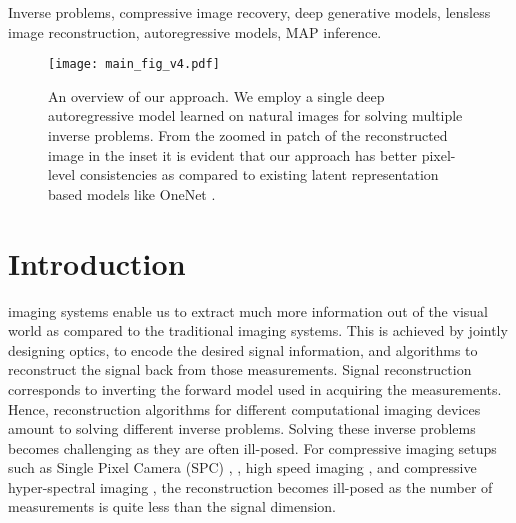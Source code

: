 \documentclass[journal,twoside]{IEEEtran}
\begin{document}
\begin{IEEEkeywords}
Inverse problems, compressive image recovery, deep generative models, lensless image reconstruction,  autoregressive models, MAP inference.
\end{IEEEkeywords}






%
\IEEEpeerreviewmaketitle

\begin{figure*}
    \centering
    \texttt{[image: main\_fig\_v4.pdf]}
    \caption{An overview of our approach. We employ a single deep autoregressive model learned on natural images for solving multiple inverse problems. From the zoomed in patch of the reconstructed image in the inset it is evident that our approach has better pixel-level consistencies as compared to existing latent representation based models like OneNet \cite{chang2017one}.}
    \label{fig:main_fig}
\end{figure*}

\section{Introduction}

 imaging systems enable us to extract much more information out of the visual world as compared to the traditional imaging systems. This is achieved by jointly designing optics, to encode the desired signal information, and algorithms to reconstruct the signal back from those measurements. Signal reconstruction corresponds to inverting the forward model used in acquiring the measurements. Hence, reconstruction algorithms for different computational imaging devices amount to solving different inverse problems. Solving these inverse problems becomes challenging as they are often ill-posed. For  compressive imaging setups such as Single Pixel Camera (SPC) \cite{duarte2008single}, \cite{wang2015lisens}, high speed imaging \cite{reddy2011p2c2},  \cite{hitomi2011video} and compressive hyper-spectral imaging \cite{wagadarikar2008single}, the reconstruction becomes ill-posed as the number of measurements is quite less than the signal dimension. %
\end{document}
